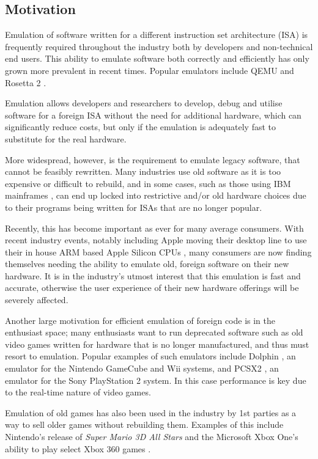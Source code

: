 \subsection{Motivation}

Emulation of software written for a different instruction set architecture (ISA) is frequently required throughout the industry both by developers and non-technical end users. This ability to emulate software both correctly and efficiently has only grown more prevalent in recent times.  Popular emulators include QEMU \cite{qemu} and Rosetta 2 \cite{rosetta2}.

Emulation allows developers and researchers to develop, debug and utilise software for a foreign ISA without the need for additional hardware, which can significantly reduce costs, but only if the emulation is adequately fast to substitute for the real hardware.

More widespread, however, is the requirement to emulate legacy software, that cannot be feasibly rewritten. Many industries use old software as it is too expensive or difficult to rebuild, and in some cases, such as those using IBM mainframes \cite{ibm-mainframe}, can end up locked into restrictive and/or old hardware choices due to their programs being written for ISAs that are no longer popular.

Recently, this has become important as ever for many average consumers. With recent industry events, notably including Apple moving their desktop line to use their in house ARM based Apple Silicon CPUs \cite{apple-silicon,rosetta2}, many consumers are now finding themselves needing the ability to emulate old, foreign software on their new hardware. It is in the industry's utmost interest that this emulation is fast and accurate, otherwise the user experience of their new hardware offerings will be severely affected.

Another large motivation for efficient emulation of foreign code is in the enthusiast space; many enthusiasts want to run deprecated software such as old video games written for hardware that is no longer manufactured, and thus must resort to emulation. Popular examples of such emulators include Dolphin \cite{dolphin}, an emulator for the Nintendo GameCube and Wii systems, and PCSX2 \cite{PCSX2}, an emulator for the Sony PlayStation 2 system. In this case performance is key due to the real-time nature of video games.

Emulation of old games has also been used in the industry by 1st parties as a way to sell older games without rebuilding them. Examples of this include Nintendo's release of \emph{Super Mario 3D All Stars} \cite{mario-emulation} and the Microsoft Xbox One's ability to play select Xbox 360 games \cite{xbox360-emulation}.
